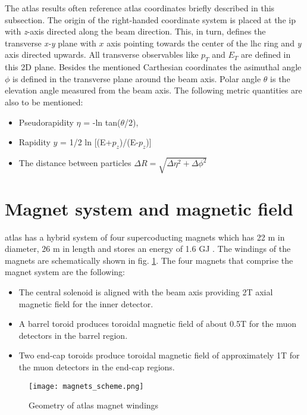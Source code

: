 		The \gls{atlas} results often reference \gls{atlas} coordinates briefly described in this subsection. The origin of the right-handed coordinate system is placed at the \gls{ip} with \textit{z}-axis directed along the beam direction. This, in turn, defines the transverse \textit{x-y} plane with $\textit{x}$ axis pointing towards the center of the \gls{lhc} ring and \textit{y} axis directed upwards. All transverse observables like $p_T$ and $E_T$ are defined in this 2D plane. Besides the mentioned Carthesian coordinates the asimuthal angle \textit{$\phi$} is defined in the transverse plane around the beam axis. Polar angle \textit{$\theta$} is the elevation angle measured from the beam axis. The following metric quantities are also to be mentioned:
		\begin{itemize}
		\item Pseudorapidity $\eta$ = -ln tan($\theta$/2),
		\item Rapidity $y$ = 1/2 ln [(E+$p_z$)/(E-$p_z$)]
		\item The distance between particles $\Delta R = \sqrt{\Delta \eta^2 + \Delta \phi ^2}$
		\end{itemize}
        
        \section{Magnet system and magnetic field}\label{atlas_magnets}
        \gls{atlas} has a hybrid system of four supercoducting magnets which has 22 m in diameter, 26 m in length and stores an energy of 1.6 GJ \cite{magnet_tdr1}. The windings of the magnets are schematically shown in fig. \ref{fig::atlas_magnets}. The four magnets that comprise the magnet system are the following: 
        		\begin{itemize}
        	\item The central solenoid is aligned with the beam axis providing 2T axial magnetic field for the inner detector.
        	\item A barrel toroid produces toroidal magnetic field of about 0.5T for the muon detectors in the barrel region.
        	\item Two end-cap toroids produce toroidal magnetic field of approximately 1T for the muon detectors in the end-cap regions.
        \end{itemize}
        \begin{figure}[htpb]
        	\centering
        	\texttt{[image: magnets\_scheme.png]}
        	\caption{Geometry of \gls{atlas} magnet windings}
        	\label{fig::atlas_magnets}
        \end{figure}
